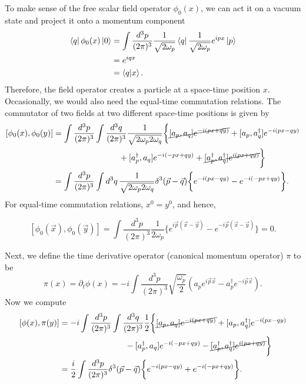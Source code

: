 \documentclass[11pt]{article}
\theoremstyle{definition}
\begin{document}
To make sense of the free scalar field operator $\phi_0(x)$, we can act it on a vacuum state and project it onto a momentum component
\begin{align*}
    \bra{q}\phi_0(x)\ket{0} & = \int \frac{d^3p}{(2\pi)^3} \frac{1}{\sqrt{2\omega_p}}\bra{q}\frac{1}{\sqrt{2\omega_p}}e^{ipx}\ket{p} \\
& = e^{iqx} \\
& = \braket{q}{x}.
\end{align*}
Therefore, the field operator creates a particle at a space-time position $x$.
Occasionally, we would also need the equal-time commutation relations. The commutator of two fields at two different space-time positions is given by
\begin{equation}
\begin{aligned}
\left[\phi_0(x), \phi_0(y) \right] &= \int \frac{d^3p}{(2\pi)^3} \int \frac{d^3q}{(2\pi)^3} \frac{1}{\sqrt{2\omega_p 2\omega_q}} \biggl\{ \cancel{[a_p, a_q]e^{-i(px+qy)}} + [a_p, a_q^\dagger]e^{-i(px-qy)} \\
&\qquad \qquad \qquad \qquad + [a_p^\dagger, a_q]e^{-i(-px+qy)} + \cancel{[a_p^\dagger, a_q^\dagger]e^{i(px+qy)}} \biggr\} \\
&= \int \frac{d^3p}{(2\pi)^3} \int d^3q \, \frac{1}{\sqrt{2\omega_p 2\omega_q}}\delta^3(\vec{p}-\vec{q}) \biggl\{ e^{-i(px-qy)} - e^{-i(-px+qy)} \biggr\}.
\end{aligned}
\end{equation}
For equal-time commutation relations, $x^0 = y^0$, and hence,
\begin{shaded}
    \begin{equation}
        \left[\phi_0(\vec{x}), \phi_0(\vec{y}) \right] = \int \frac{d^3p}{(2\pi)^3} \frac{1}{2\omega_p}\biggl\{e^{i\vec{p}(\vec{x}-\vec{y})} - e^{-i\vec{p}(\vec{x}-\vec{y})} \biggr\} = 0.
    \end{equation}
    \label{Eq. E-T 1}
\end{shaded}
Next, we define the time derivative operator (canonical momentum operator) $\pi$ to be
\begin{equation}
    \pi(x) = \partial_t\phi(x) = -i\int \frac{d^3p}{(2\pi)^3} \sqrt{\frac{\omega_p}{2}}(a_pe^{i\vec{p}\vec{x}} - a_p^\dagger e^{-i\vec{p}\vec{x}}).
\end{equation}
Now we compute
\begin{equation}
\begin{aligned}
    \left[\phi(x), \pi(y)\right] &= -i\int \frac{d^3p}{(2\pi)^3} \int \frac{d^3q}{(2\pi)^3} \frac{1}{2} \biggl\{ \cancel{[a_p, a_q]e^{-i(px+qy)}} + [a_p, a_q^\dagger]e^{-i(px-qy)} \\
&\qquad \qquad \qquad \qquad - [a_p^\dagger, a_q]e^{-i(-px+qy)} - \cancel{[a_p^\dagger, a_q^\dagger]e^{i(px+qy)}} \biggr\} \\
&= \frac{i}{2}\int \frac{d^3p}{(2\pi)^3}\delta^3(\vec{p}-\vec{q}) \biggl\{ e^{-i(px-qy)} + e^{-i(-px+qy)} \biggr\}.
\end{aligned}
\end{equation}
\end{document}
